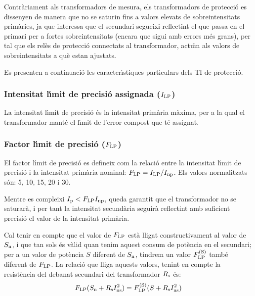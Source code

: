Contr\`{a}riament als transformadors de mesura, els transformadors de
protecci\'{o} es dissenyen de manera que no se saturin fins a  valors
elevats de sobreintensitats prim\`{a}ries, ja que interessa que el
secundari segueixi reflectint el que passa en el primari per a
fortes sobreintensitats (encara que sigui amb errors m\'{e}s grans), per
tal que els rel\`{e}s de protecci\'{o} connectats al transformador, actu\"{\i}n
als valors de sobreintensitats a qu\`{e} estan ajustats.

Es presenten a continuaci\'{o} les caracter\'{\i}stiques particulars dels TI
de protecci\'{o}.

\subsubsection{Intensitat l\'{\i}mit de precisi\'{o} assignada ($I_\mathrm{LP}$)}

 La intensitat
l\'{\i}mit de precisi\'{o} \'{e}s la intensitat prim\`{a}ria m\`{a}xima, per a la qual el transformador mant\'{e} el l\'{\i}mit
de l'error compost que t\'{e} assignat.

\subsubsection{Factor l\'{\i}mit de precisi\'{o} ($F_\mathrm{LP}$) }

 El factor l\'{\i}mit de precisi\'{o}
es defineix com la relaci\'{o} entre la intensitat l\'{\i}mit de precisi\'{o}
i la intensitat prim\`{a}ria nominal: $F_\mathrm{LP} = I_\mathrm{LP} /I_\mathrm{np}$.
Els valors normalitzats s\'{o}n: 5, 10, 15, 20 i 30.

Mentre es compleixi  $I_\mathrm{p}<F_\mathrm{LP} I_\mathrm{np}$, queda garantit
que el transformador no se saturar\`{a}, i per tant la intensitat
secund\`{a}ria seguir\`{a} reflectint amb suficient precisi\'{o} el valor de la
intensitat prim\`{a}ria.

Cal tenir en compte que el valor de $F_\mathrm{LP}$ est\`{a} lligat
constructivament al valor de $S_\mathrm{n}$, i que tan sols \'{e}s v\`{a}lid
quan tenim aquest consum de  pot\`{e}ncia en el secundari; per a un
valor de pot\`{e}ncia $S$ diferent de $S_\mathrm{n}$, tindrem un valor
$F_\mathrm{LP}^\mathrm{(S)}$ tamb\'{e} diferent de  $F_\mathrm{LP}$. La relaci\'{o} que
lliga aquests valors, tenint en compte la resist\`{e}ncia del debanat
secundari del transformador  $R_\mathrm{s}$ \'{e}s:
\begin{equation}\label{eq:flp}
    F_\mathrm{LP} (S_\mathrm{n}+R_\mathrm{s}I_\mathrm{ns}^2) =
    F_\mathrm{LP}^\mathrm{(S)} (S+R_\mathrm{s}I_\mathrm{ns}^2)
\end{equation}

